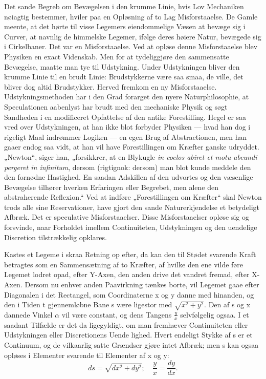 \documentclass[12pt,a4paper]{book}
\begin{document}
Det sande Begreb om Bevægelsen i den krumme Linie, hvis Lov Mechaniken
nøiagtig bestemmer, hviler paa en Opløsning af to Lag Misforstaaelse. De
Gamle meente, at det hørte til visse Legemers eiendommelige Væsen at
bevæge sig i Curver, at navnlig de himmelske Legemer, ifølge deres
høiere Natur, bevægede sig i Cirkelbaner. Det var en Misforstaaelse. Ved
at opløse denne Misforstaaelse blev Physiken en exact Videnskab. Men for
at tydeliggjøre den sammensatte Bevægelse, maatte man tye til
Udstykning. Under Udstykningen bliver den krumme Linie til en brudt
Linie: Brudstykkerne være saa smaa, de ville, det bliver
dog altid Brudstykker. Herved fremkom en ny Misforstaaelse.
Udstykningsmethoden har i den Grad forarget den nyere
Naturphilosophie, at Speculationen aabenlyst har brudt med den
mechaniske Physik og søgt Sandheden i en modificeret Opfattelse af den
antike Forestilling. Hegel er saa vred over Udstykningen, at han ikke
blot forbyder Physiken --- hvad han dog i rigeligt Maal indrømmer
Logiken --- en egen Brug af Abstractionen, men han gaaer endog saa vidt,
at han vil have Forestillingen om Kræfter ganske udryddet. „Newton“,
siger han, „forsikkrer, at en Blykugle \textit{in coelos abiret et motu
abeundi pergeret in infinitum}, dersom (rigtignok: dersom) man blot
kunde meddele den den fornødne Hastighed. En saadan Adskillen af den
udvortes og den væsenlige Bevægelse tilhører hverken Erfaringen eller
Begrebet, men alene den abstraherende Reflexion.“ Ved at indføre
„Forestillingen om Kræfter“ skal Newton trods alle sine Reservationer,
have gjort den sande Naturerkjendelse et betydeligt Afbræk. Det er
speculative Misforstaaelser. Disse Misforstaaelser opløse sig og
forsvinde, naar Forholdet imellem Continuiteten, Udstykningen og den
uendelige Discretion tilstrækkelig opklares.

Kastes et Legeme i skraa Retning op efter, da kan den til Stødet
svarende Kraft betragtes som en Sammensætning af to Kræfter, af hvilke
den ene vilde føre Legemet lodret opad, efter Y-Axen, den anden drive
det vandret fremad, efter X-Axen. Dersom nu enhver anden Paavirkning
tænkes borte, vil Legemet gaae efter Diagonalen i det Rectangel, som
Coordinaterne x og y danne med hinanden, og den i Tiden t gjennemløbne
Bane s være ligestor med $\sqrt{x^2 + y^2}$. Den af s og x dannede
Vinkel $\alpha$ vil være constant, og dens Tangens $\frac{y}{x}$
selvfølgelig ogsaa. I et saadant Tilfælde er det da ligegyldigt, om man
fremhæver Continuiteten eller Udstykningen eller Discretionens Uende\-%
lighed. Hvert endeligt Stykke af s er et Continuum, og de vilkaarlig
satte Grændser gjøre intet Afbræk; men s kan ogsaa opløses i Elementer
svarende til Elementer af x og y:
\[
ds = \sqrt{dx^2 + dy^2};\quad \frac{y}{x} = \frac{dy}{dx}.
\]
\end{document}

